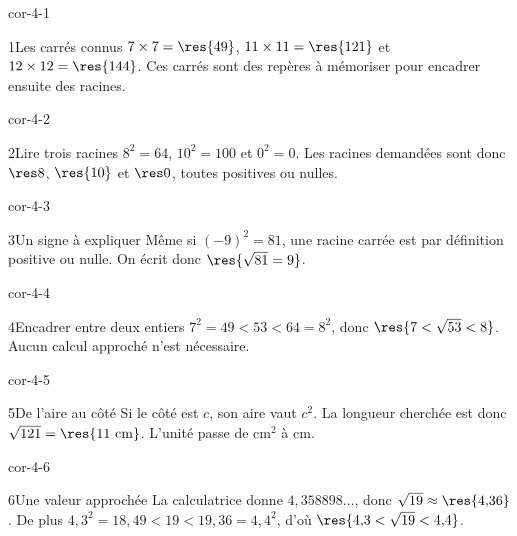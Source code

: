 \clearpage\pagestyle{otMain}\setlength{\otBlocEspacement}{2.5mm}\fontsize{11}{15}\selectfont{}
\begin{blocLivre}{cor-4-1}\begin{corrige}{1}{Les carrés connus}
$7\times7=\res{49}$, $11\times11=\res{121}$ et $12\times12=\res{144}$. Ces carrés sont des repères à mémoriser pour encadrer ensuite des racines.
\end{corrige}\end{blocLivre}
\begin{blocLivre}{cor-4-2}\begin{corrige}{2}{Lire trois racines}
$8^2=64$, $10^2=100$ et $0^2=0$. Les racines demandées sont donc $\res8$, $\res{10}$ et $\res0$, toutes positives ou nulles.
\end{corrige}\end{blocLivre}
\begin{blocLivre}{cor-4-3}\begin{corrige}{3}{Un signe à expliquer}
Même si $(-9)^2=81$, une racine carrée est par définition positive ou nulle. On écrit donc $\res{\sqrt{81}=9}$.
\end{corrige}\end{blocLivre}
\begin{blocLivre}{cor-4-4}\begin{corrige}{4}{Encadrer entre deux entiers}
$7^2=49<53<64=8^2$, donc $\res{7<\sqrt{53}<8}$. Aucun calcul approché n’est nécessaire.
\end{corrige}\end{blocLivre}
\begin{blocLivre}{cor-4-5}\begin{corrige}{5}{De l’aire au côté}
Si le côté est $c$, son aire vaut $c^2$. La longueur cherchée est donc $\sqrt{121}=\res{11\ \mathrm{cm}}$. L’unité passe de cm$^2$ à cm.
\label{fig-cor-4-5}
\end{corrige}\end{blocLivre}
\begin{blocLivre}{cor-4-6}\begin{corrige}{6}{Une valeur approchée}
La calculatrice donne $4{,}358898\ldots$, donc $\sqrt{19}\approx\res{4{,}36}$. De plus $4{,}3^2=18{,}49<19<19{,}36=4{,}4^2$, d’où $\res{4{,}3<\sqrt{19}<4{,}4}$.
\end{corrige}\end{blocLivre}
